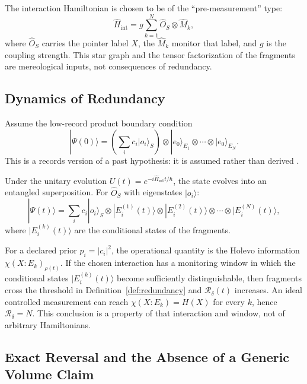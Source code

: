 \documentclass[12pt,a4paper]{article}
\begin{document}
The interaction Hamiltonian is chosen to be of the ``pre-measurement'' type:
\begin{equation}
\hat{H}_{\text{int}} = g \sum_{k=1}^{N} \hat{O}_S \otimes \hat{M}_k,
\end{equation}
where $\hat{O}_S$ carries the pointer label $X$, the $\hat{M}_k$ monitor that label, and $g$ is the coupling strength.  This star graph and the tensor factorization of the fragments are mereological inputs, not consequences of redundancy.

\subsection{Dynamics of Redundancy}

Assume the low-record product boundary condition
\begin{equation}
|\Psi(0)\rangle = \left(\sum_i c_i|o_i\rangle_S\right)
\otimes |e_0\rangle_{E_1}\otimes\cdots\otimes|e_0\rangle_{E_N}.
\end{equation}
This is a records version of a past hypothesis: it is assumed rather than derived \cite{Albert2000,Wallace2010}.

Under the unitary evolution $U(t) = e^{-i\hat{H}_{\text{int}}t/\hbar}$, the state evolves into an entangled superposition. For $\hat{O}_S$ with eigenstates $|o_i\rangle$:
\begin{equation}
|\Psi(t)\rangle = \sum_i c_i |o_i\rangle_S \otimes |E_i^{(1)}(t)\rangle \otimes |E_i^{(2)}(t)\rangle \otimes \cdots \otimes |E_i^{(N)}(t)\rangle,
\end{equation}
where $|E_i^{(k)}(t)\rangle$ are the conditional states of the fragments.

For a declared prior $p_i=|c_i|^2$, the operational quantity is the Holevo information $\chi(X:E_k)_{\rho(t)}$.  If the chosen interaction has a monitoring window in which the conditional states $|E_i^{(k)}(t)\rangle$ become sufficiently distinguishable, then fragments cross the threshold in Definition~\ref{def:redundancy} and $\mathcal R_\delta(t)$ increases.  An ideal controlled measurement can reach $\chi(X:E_k)=H(X)$ for every $k$, hence $\mathcal R_\delta=N$.  This conclusion is a property of that interaction and window, not of arbitrary Hamiltonians.

\subsection{Exact Reversal and the Absence of a Generic Volume Claim}
\end{document}
